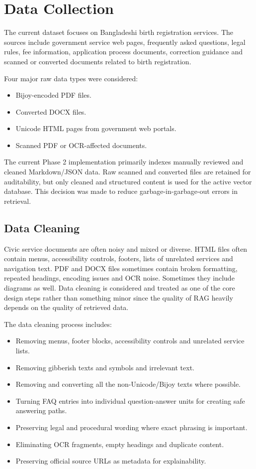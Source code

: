 \section{Data Collection}

The current dataset focuses on Bangladeshi birth registration services. The sources include government service web pages, frequently asked questions, legal rules, fee information, application process documents, correction guidance and scanned or converted documents related to birth registration.

Four major raw data types were considered:

\begin{itemize}
    \item Bijoy-encoded PDF files.
    \item Converted DOCX files.
    \item Unicode HTML pages from government web portals.
    \item Scanned PDF or OCR-affected documents.
\end{itemize}

The current Phase 2 implementation primarily indexes manually reviewed and cleaned Markdown/JSON data. Raw scanned and converted files are retained for auditability, but only cleaned and structured content is used for the active vector database. This decision was made to reduce garbage-in-garbage-out errors in retrieval.

\subsection{Data Cleaning}

Civic service documents are often noisy and mixed or diverse. HTML files often contain menus, accessibility controls, footers, lists of unrelated services and navigation text. PDF and DOCX files sometimes contain broken formatting, repeated headings, encoding issues and OCR noise. Sometimes they include diagrams as well. Data cleaning is considered and treated as one of the core design steps rather than something minor since the quality of RAG heavily depends on the quality of retrieved data.

The data cleaning process includes:

\begin{itemize}
    \item Removing menus, footer blocks, accessibility controls and unrelated service lists.
    \item Removing gibberish texts and symbols and irrelevant text.
    \item Removing and converting all the non-Unicode/Bijoy texts where possible.
    \item Turning FAQ entries into individual question-answer units for creating safe answering paths.
    \item Preserving legal and procedural wording where exact phrasing is important.
    \item Eliminating OCR fragments, empty headings and duplicate content.
    \item Preserving official source URLs as metadata for explainability.
\end{itemize}

